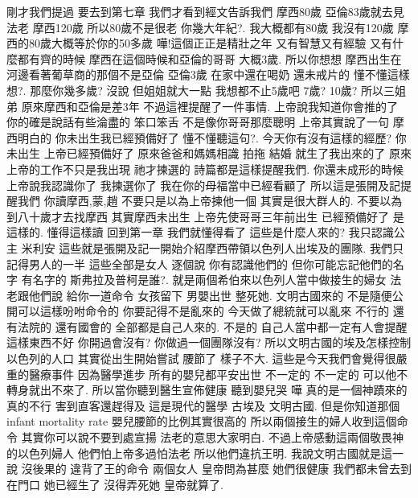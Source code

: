 \documentclass{book}
\begin{document}
剛才我們提過 要去到第七章 我們才看到經文告訴我們 摩西80歲 亞倫83歲就去見法老 摩西120歲 所以80歲不是很老 你幾大年紀?.
我大概都有80歲 我沒有120歲 摩西的80歲大概等於你的50多歲 嘩!這個正正是精壯之年 又有智慧又有經驗 又有什麼都有齊的時候 摩西在這個時候和亞倫的哥哥 大概3歲.
所以你想想 摩西出生在河邊看著葡草商的那個不是亞倫 亞倫3歲 在家中還在喝奶 還未戒片的 懂不懂這樣想?.
那麼你幾多歲? 沒說 但姐姐就大一點 我想都不止5歲吧 7歲? 10歲? 所以三姐弟 原來摩西和亞倫是差3年 不過這裡提醒了一件事情.
上帝說我知道你會推的了 你的確是說話有些淪盡的 笨口笨舌 不是像你哥哥那麼聰明 上帝其實說了一句 摩西明白的 你未出生我已經預備好了 懂不懂聽這句?.
今天你有沒有這樣的經歷? 你未出生 上帝已經預備好了 原來爸爸和媽媽相識 拍拖 結婚 就生了我出來的了 原來上帝的工作不只是我出現 祂才揀選的 詩篇都是這樣提醒我們.
你還未成形的時候 上帝說我認識你了 我揀選你了 我在你的母福當中已經看顧了 所以這是張開及記提醒我們 你讀摩西,蒙,趙 不要只是以為上帝揀他一個 其實是很大群人的.
不要以為到八十歲才去找摩西 其實摩西未出生 上帝先使哥哥三年前出生 已經預備好了 是這樣的.
懂得這樣讀 回到第一章 我們就懂得看了 這些是什麼人來的? 我只認識公主 米利安 這些就是張開及記一開始介紹摩西帶領以色列人出埃及的團隊.
我們只記得男人的一半 這些全部是女人 逐個說 你有認識他們的 但你可能忘記他們的名字 有名字的 斯弗拉及普柯是誰?.
就是兩個希伯來以色列人當中做接生的婦女 法老跟他們說 給你一道命令 女孩留下 男嬰出世 整死她.
文明古國來的 不是隨便公開可以這樣吩咐命令的 你要記得不是亂來的 今天做了總統就可以亂來 不行的 還有法院的 還有國會的 全部都是自己人來的.
不是的 自己人當中都一定有人會提醒 這樣東西不好 你開過會沒有? 你做過一個團隊沒有? 所以文明古國的埃及怎樣控制以色列的人口 其實從出生開始嘗試 腰節了 樣子不大.
這些是今天我們會覺得很嚴重的醫療事件 因為醫學進步 所有的嬰兒都平安出世 不一定的 不一定的 可以他不轉身就出不來了.
所以當你聽到醫生宣佈健康 聽到嬰兒哭 嘩 真的是一個神蹟來的 真的不行 害到直客還趕得及 這是現代的醫學 古埃及 文明古國.
但是你知道那個infant mortality rate 嬰兒腰節的比例其實很高的 所以兩個接生的婦人收到這個命令 其實你可以說不要到處宣揚 法老的意思大家明白.
不過上帝感動這兩個敬畏神的以色列婦人 他們怕上帝多過怕法老 所以他們違抗王明.
我說文明古國就是這一說 沒後果的 違背了王的命令 兩個女人 皇帝問為甚麼 她們很健康 我們都未曾去到 在門口 她已經生了 沒得弄死她 皇帝就算了.
\end{document}

